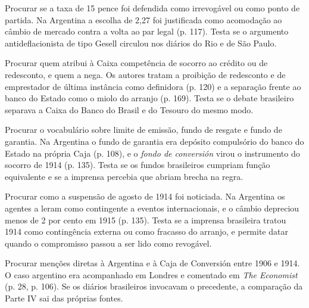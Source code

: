 \begin{dialogo}
\item Procurar se a taxa de 15 pence foi defendida como irrevogável ou como
ponto de partida. Na Argentina a escolha de 2,27 foi justificada como
acomodação ao câmbio de mercado contra a volta ao par legal (p. 117). Testa se
o argumento antideflacionista de tipo Gesell circulou nos diários do Rio e de
São Paulo.
\item Procurar quem atribui à Caixa competência de socorro ao crédito ou de
redesconto, e quem a nega. Os autores tratam a proibição de redesconto e de
emprestador de última instância como definidora (p. 120) e a separação frente
ao banco do Estado como o miolo do arranjo (p. 169). Testa se o debate
brasileiro separava a Caixa do Banco do Brasil e do Tesouro do mesmo modo.
\item Procurar o vocabulário sobre limite de emissão, fundo de resgate e fundo
de garantia. Na Argentina o fundo de garantia era depósito compulsório do banco
do Estado na própria Caja (p. 108), e o \emph{fondo de conversión} virou o
instrumento do socorro de 1914 (p. 135). Testa se os fundos brasileiros
cumpriam função equivalente e se a imprensa percebia que abriam brecha na
regra.
\item Procurar como a suspensão de agosto de 1914 foi noticiada. Na Argentina
os agentes a leram como contingente a eventos internacionais, e o câmbio
depreciou menos de 2 por cento em 1915 (p. 135). Testa se a imprensa brasileira
tratou 1914 como contingência externa ou como fracasso do arranjo, e permite
datar quando o compromisso passou a ser lido como revogável.
\item Procurar menções diretas à Argentina e à Caja de Conversión entre 1906 e
1914. O caso argentino era acompanhado em Londres e comentado em \emph{The
Economist} (p. 28, p. 106). Se os diários brasileiros invocavam o precedente, a
comparação da Parte IV sai das próprias fontes.
\end{dialogo}


